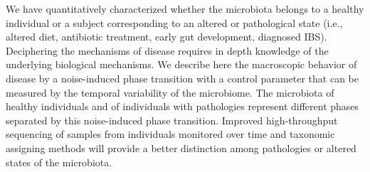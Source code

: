 We have quantitatively characterized whether the microbiota belongs to a healthy individual or a subject corresponding to an altered or pathological state (i.e., altered diet, antibiotic treatment, early gut development, diagnosed IBS). Deciphering the mechanisms of disease requires in depth knowledge of the underlying biological mechanisms. We describe here the macroscopic behavior of disease by a noise-induced phase transition with a control parameter that can be measured by the temporal variability of the microbiome. The microbiota of healthy individuals and of individuals with pathologies represent different phases separated by this noise-induced phase transition. Improved high-throughput sequencing of samples from individuals monitored over time and taxonomic assigning methods will provide a better distinction among pathologies or altered states of the microbiota.
